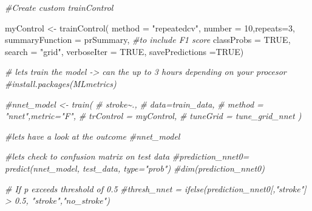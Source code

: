 \documentclass[
]{article}
\newenvironment{Shaded}{\begin{snugshade}}{\end{snugshade}}
\newcommand{\AttributeTok}[1]{\textcolor[rgb]{0.77,0.63,0.00}{#1}}
\newcommand{\CommentTok}[1]{\textcolor[rgb]{0.56,0.35,0.01}{\textit{#1}}}
\newcommand{\ConstantTok}[1]{\textcolor[rgb]{0.00,0.00,0.00}{#1}}
\newcommand{\DecValTok}[1]{\textcolor[rgb]{0.00,0.00,0.81}{#1}}
\newcommand{\FunctionTok}[1]{\textcolor[rgb]{0.00,0.00,0.00}{#1}}
\newcommand{\NormalTok}[1]{#1}
\newcommand{\OtherTok}[1]{\textcolor[rgb]{0.56,0.35,0.01}{#1}}
\newcommand{\StringTok}[1]{\textcolor[rgb]{0.31,0.60,0.02}{#1}}
\renewcommand{\=}[1]{\stackrel{#1}{=}}
\theoremstyle{definition}
\theoremstyle{remark}
\begin{document}
\begin{Shaded}
\begin{Highlighting}[]
\CommentTok{\#Create custom trainControl}

\NormalTok{myControl }\OtherTok{\textless{}{-}} \FunctionTok{trainControl}\NormalTok{(}
  \AttributeTok{method =} \StringTok{"repeatedcv"}\NormalTok{, }
  \AttributeTok{number =} \DecValTok{10}\NormalTok{,}\AttributeTok{repeats=}\DecValTok{3}\NormalTok{,}
  \AttributeTok{summaryFunction =}\NormalTok{ prSummary, }\CommentTok{\#to include F1 score}
  \AttributeTok{classProbs =} \ConstantTok{TRUE}\NormalTok{, }\AttributeTok{search =} \StringTok{"grid"}\NormalTok{, }
  \AttributeTok{verboseIter =} \ConstantTok{TRUE}\NormalTok{, }\AttributeTok{savePredictions =}\ConstantTok{TRUE}\NormalTok{)}
\end{Highlighting}
\end{Shaded}

\begin{Shaded}
\begin{Highlighting}[]
\CommentTok{\# let\textquotesingle{}s train the model {-}\textgreater{} can the up to 3 hours depending on your procesor}
\CommentTok{\#install.packages(\textquotesingle{}MLmetrics\textquotesingle{})}

\CommentTok{\#nnet\_model \textless{}{-} train(}
\CommentTok{\#  stroke\textasciitilde{}.,}
\CommentTok{\#  data=train\_data,}
\CommentTok{\#  method = "nnet",metric="F",}
\CommentTok{\#  trControl = myControl,}
\CommentTok{\#  tuneGrid = tune\_grid\_nnet    )}
\end{Highlighting}
\end{Shaded}

\begin{Shaded}
\begin{Highlighting}[]
\CommentTok{\#lets have a look at the outcome}
\CommentTok{\#nnet\_model}
\end{Highlighting}
\end{Shaded}

\begin{Shaded}
\begin{Highlighting}[]
\CommentTok{\#lets check to confusion matrix on test data}
\CommentTok{\#prediction\_nnet0= predict(nnet\_model, test\_data, type="prob")}
\CommentTok{\#dim(prediction\_nnet0)}
\end{Highlighting}
\end{Shaded}

\begin{Shaded}
\begin{Highlighting}[]
\CommentTok{\# If p exceeds threshold of 0.5}
\CommentTok{\#thresh\_nnet = ifelse(prediction\_nnet0[,"stroke"] \textgreater{} 0.5, "stroke","no\_stroke")}
\end{Highlighting}
\end{Shaded}
\end{document}
